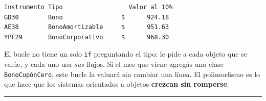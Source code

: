 \documentclass[
  spanish,
  letterpaper,
  DIV=11,
  numbers=noendperiod]{scrreprt}
\newenvironment{Shaded}{\begin{snugshade}}{\end{snugshade}}
\newcommand{\BuiltInTok}[1]{\textcolor[rgb]{0.00,0.23,0.31}{#1}}
\newcommand{\ControlFlowTok}[1]{\textcolor[rgb]{0.00,0.23,0.31}{\textbf{#1}}}
\newcommand{\DecValTok}[1]{\textcolor[rgb]{0.68,0.00,0.00}{#1}}
\newcommand{\FloatTok}[1]{\textcolor[rgb]{0.68,0.00,0.00}{#1}}
\newcommand{\KeywordTok}[1]{\textcolor[rgb]{0.00,0.23,0.31}{\textbf{#1}}}
\newcommand{\NormalTok}[1]{\textcolor[rgb]{0.00,0.23,0.31}{#1}}
\newcommand{\OperatorTok}[1]{\textcolor[rgb]{0.37,0.37,0.37}{#1}}
\newcommand{\SpecialCharTok}[1]{\textcolor[rgb]{0.37,0.37,0.37}{#1}}
\newcommand{\SpecialStringTok}[1]{\textcolor[rgb]{0.13,0.47,0.30}{#1}}
\newcommand{\StringTok}[1]{\textcolor[rgb]{0.13,0.47,0.30}{#1}}
\newcommand{\VariableTok}[1]{\textcolor[rgb]{0.07,0.07,0.07}{#1}}
\begin{document}
\label{polimorfismo}
\begin{Shaded}
\end{Shaded}

\begin{verbatim}
Instrumento Tipo                  Valor al 10%
GD30        Bono                $      924.18
AE38        BonoAmortizable     $      951.63
YPF29       BonoCorporativo     $      968.30
\end{verbatim}

El bucle no tiene un solo \texttt{if} preguntando el tipo: le pide a
cada objeto que se valúe, y cada uno usa \emph{sus} flujos. Si el mes
que viene agregás una clase \texttt{BonoCupónCero}, este bucle la
valuará sin cambiar una línea. El polimorfismo es lo que hace que los
sistemas orientados a objetos \textbf{crezcan sin romperse}.

\begin{center}\rule{0.5\linewidth}{0.5pt}\end{center}
\end{document}
